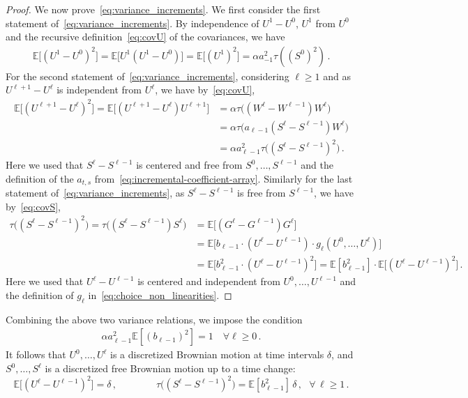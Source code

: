 \documentclass[11pt]{article}
\theoremstyle{definition}
\theoremstyle{remark}
\numberwithin{equation}{section}
\numberwithin{theorem}{section}
\newcommand{\E}{\mathbb E}
\newcommand{\taup}{\tau}
\begin{document}
\begin{proof}
We now prove~\eqref{eq:variance_increments}. We first consider the first statement of~\eqref{eq:variance_increments}. By independence of $U^1-U^0$, $U^1$ from $U^0$ and the recursive definition~\eqref{eq:covU} of the covariances, we have 
\begin{align*}
\E\big[ (U^{1} - U^{0})^2 \big] = \E\big[ U^1(U^1 - U^0) \big] = \E\big[ (U^1)^2 \big] = \alpha a^2_{-1} \taup((S^0)^2)\,.
\end{align*}
For the second statement of~\eqref{eq:variance_increments}, considering $\ell \ge 1$ and as $U^{\ell+1}-U^\ell$ is independent from $U^\ell$, we have by~\eqref{eq:covU},
\begin{align*}
\E\big[ (U^{\ell+1} - U^{\ell})^2 \big] = \E\big[ (U^{\ell+1} - U^\ell) U^{\ell+1} \big] &= \alpha \taup\big( (W^\ell - W^{\ell-1}) W^\ell \big) \\
&= \alpha \taup\big( a_{\ell-1} (S^\ell - S^{\ell-1}) W^\ell \big) \\
&= \alpha a^2_{\ell-1} \taup\big( (S^\ell - S^{\ell-1})^2 \big)\,.
\end{align*}
Here we used that $S^\ell - S^{\ell-1}$ is centered and free from $S^0, \ldots, S^{\ell-1}$ and the definition of the $a_{t,s}$ from~\eqref{eq:incremental-coefficient-array}. Similarly for the last statement of~\eqref{eq:variance_increments}, as $S^{\ell} - S^{\ell-1}$ is free from $S^{\ell-1}$, we have by~\eqref{eq:covS},
\begin{align*}
\taup \big( (S^{\ell} - S^{\ell-1})^2 \big) = \taup\big( (S^{\ell} - S^{\ell-1}) S^\ell \big) &= \E\big[ (G^\ell - G^{\ell - 1}) G^\ell \big] \\
&= \E\big[  b_{\ell-1} \cdot (U^\ell - U^{\ell-1}) \cdot g_\ell(U^0, \ldots, U^\ell) \big] \\
&= \E\big[  b_{\ell-1}^2 \cdot (U^\ell - U^{\ell-1})^2 \big] = \E[b_{\ell-1}^2]\cdot\E\big[ (U^{\ell} - U^{\ell-1})^2 \big]\,.
\end{align*}
Here we used that $U^\ell - U^{\ell-1}$ is centered and independent from $U^0, \ldots, U^{\ell-1}$ and the definition of $g_\ell$ in~\eqref{eq:choice_non_linearities}. 
\end{proof}

Combining the above two variance relations, we impose the condition
\begin{align}\label{eq:variance_preserve_discretetime}
\alpha  a_{\ell-1}^2 \E[(b_{\ell-1})^2] = 1
\quad \forall \ell \ge 0\,.
\end{align}
It follows that $U^0,\ldots, U^\ell$ is a discretized Brownian motion at time intervals $\delta$, and $S^0,\ldots, S^\ell$ is a discretized free Brownian motion up to a time change:  
 \begin{equation}\label{eq:discretized_bm}
\E\big[ (U^{\ell} - U^{\ell-1})^2 \big] = \delta \,,\qquad\qquad 
\taup \big( (S^{\ell} - S^{\ell-1})^2 \big) = \E[b_{\ell-1}^2]\, \delta\,,~~~\forall\, \ell \ge 1\,.
\end{equation}
\end{document}
